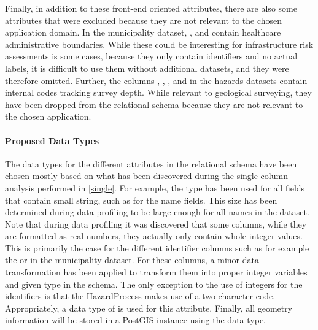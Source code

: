 Finally, in addition to these front-end oriented attributes, there are also some attributes that were excluded because they are not relevant to the chosen application domain.
In the municipality dataset, , and  contain healthcare administrative boundaries. While these could be interesting for infrastructure risk assessments is some cases, because they only contain identifiers and no actual labels, it is difficult to use them without additional datasets, and they were therefore omitted.
Further, the columns , , , and  in the hazards datasets contain internal codes tracking survey depth. While relevant to geological surveying, they have been dropped from the relational schema because they are not relevant to the chosen application.


\paragraph{Proposed Data Types}

The data types for the different attributes in the relational schema have been chosen mostly based on what has been discovered during the single column analysis performed in \cref{single}.
For example, the type  has been used for all fields that contain small string, such as for the name fields. This size has been determined during data profiling to be large enough for all names in the dataset.
Note that during data profiling it was discovered that some columns, while they are formatted as real numbers, they actually only contain whole integer values. This is primarily the case for the different identifier columns such as for example the  or  in the municipality dataset. For these columns, a minor data transformation has been applied to transform them into proper integer variables and given  type in the schema.
The only exception to the use of integers for the identifiers is that the HazardProcess makes use of a two character code. Appropriately, a data type of  is used for this attribute.
Finally, all geometry information will be stored in a PostGIS \cite{postgis2026} instance using the  data type.

